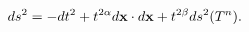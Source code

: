 \begin{equation} ds^2 = -dt^2 + t^{2\alpha}d{\bf
	    x}\cdot d{\bf x} + t^{2\beta} ds^2(T^n).  \end{equation}


